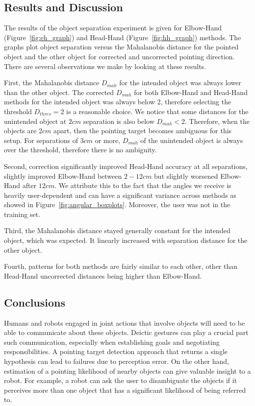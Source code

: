 \documentclass[12pt]{gatech-thesis}
\begin{document}
\subsection{Results and Discussion}
\label{sec:results_and_discussion}

The results of the object separation experiment is given for Elbow-Hand (Figure~\ref{fig:eh_graph}) and Head-Hand (Figure~\ref{fig:hh_graph}) methods. The graphs plot object separation versus the Mahalanobis distance for the pointed object and the other object for corrected and uncorrected pointing direction. There are several observations we make by looking at these results.

First, the Mahalanobis distance $D_{mah}$ for the intended object was always lower than the other object. The corrected $D_{mah}$ for both Elbow-Hand and Head-Hand methods for the intended object was always below 2, therefore selecting the threshold $D_{thres}=2$ is a reasonable choice. We notice that some distances for the unintended object at $2cm$ separation is also below $D_{mah}<2$. Therefore, when the objects are $2 cm$ apart, then the pointing target becomes ambiguous for this setup. For separations of $3cm$ or more, $D_{mah}$ of the unintended object is always over the threshold, therefore there is no ambiguity.

Second, correction significantly improved Head-Hand accuracy at all separations, slightly improved Elbow-Hand between $2-12cm$ but slightly worsened Elbow-Hand after $12cm$. We attribute this to the fact that the angles we receive is heavily user-dependent and can have a significant variance across methods as showed in Figure~\ref{fig:angular_boxplots}. Moreover, the user was not in the training set.

Third, the Mahalanobis distance stayed generally constant for the intended object, which was expected. It linearly increased with separation distance for the other object.

Fourth, patterns for both methods are fairly similar to each other, other than Head-Hand uncorrected distances being higher than Elbow-Hand.

\subsection{Conclusions}
\label{sec:pointing_conclusions}

Humans and robots engaged in joint actions that involve objects will need to be able to communicate about these objects. Deictic gestures can play a crucial part such communication, especially when establishing goals and negotiating responsibilities. A pointing target detection approach that returns a single hypothesis can lead to failures due to perception error. On the other hand, estimation of a pointing likelihood of nearby objects can give valuable insight to a robot. For example, a robot can ask the user to disambiguate the objects if it perceives more than one object that has a significant likelihood of being referred to.
\end{document}
